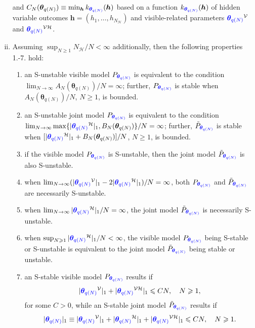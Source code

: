 \documentclass[numbib]{imamat}
\theoremstyle{theorem}
\theoremstyle{lemma}
\theoremstyle{example}
\theoremstyle{corollary}
\theoremstyle{definition}
\theoremstyle{remark}
\theoremstyle{approximation}
\theoremstyle{scheme}
\newcommand{\thetaidx}{q(N)}
\newcommand{\thetaN}{\boldsymbol \theta_{\thetaidx}}
\newcommand{\elt}{A_{N}(\thetaN) }
\newcommand{\Gam}{B_{N}(\thetaN) }
\newcommand{\Gamc}{C_{N}(\thetaN) }
\newcommand{\ak}[1]{{\color{blue} #1}}
\begin{document}
\begin{enumerate}[(i)]
$$    $$ 
    and $\Gamc \equiv \min_{ \boldsymbol h} k_{\ak{\thetaN}} (\boldsymbol h)$ based on a function  $k_{\ak{\thetaN}} (\boldsymbol h)$ of hidden variable outcomes $\boldsymbol h = (h_1,\ldots,h_{N_{\mathcal{H}}})$ and visible-related parameters $\ak{\thetaN}^{\mathcal{V}}$ and $\ak{\thetaN}^{\mathcal{VH}}$.
\item Assuming $\sup_{N \geq 1} N_{\mathcal{H}}/N<\infty$ additionally, then the following properties 1.-7. hold:
\begin{enumerate}[1.] \itemsep 0cm
    \item an S-unstable visible model $P_{\ak{\thetaN}}$ is equivalent to the condition $\lim_{N\to \infty}  \elt/N  =\infty$; further, $P_{\ak{\thetaN}}$ is stable when $\elt/N$, $N \geq 1$, is bounded.
    \item an S-unstable joint model $P_{\ak{\thetaN}}$ is equivalent to the condition $\lim_{N\to \infty} \max\{|\ak{\thetaN}^{\mathcal{H}}|_1, \Gam\}/N =\infty$; further,  $\tilde{P}_{\ak{\thetaN}}$ is stable when $[|\ak{\thetaN}^{\mathcal{H}}|_1+ \Gam]/N$, $N \geq 1$, is bounded.
    \item if the visible model $P_{\ak{\thetaN}}$   is S-unstable, then  the joint model $\tilde{P}_{\ak{\thetaN}}$ is also S-unstable.
    \item when $\lim_{N\to \infty}  (|\ak{\thetaN}^{\mathcal{V}}|_1-2|\ak{\thetaN}^{\mathcal{H}}|_1)/N =\infty$, both $P_{\ak{\thetaN}}$ and $\tilde{P}_{\ak{\thetaN}}$ are necessarily S-unstable.
    \item when $\lim_{N\to \infty}|\ak{\thetaN}^{\mathcal{H}}|_1/N =\infty$,  the joint model $\tilde{P}_{\ak{\thetaN}}$ is necessarily S-unstable.
    \item when $\sup_{N \geq 1} |\ak{\thetaN}^{\mathcal{H}}|_1 /N<\infty$, the visible model $P_{\ak{\thetaN}}$ being S-stable or S-unstable is equivalent to the joint model  $\tilde{P}_{\ak{\thetaN}}$ being stable or unstable.
    \item  an S-stable visible model $P_{\ak{\thetaN}}$ results if
        $$
        |\ak{\thetaN}^{\mathcal{V}}|_1+ |\ak{\thetaN}^{\mathcal{VH}} |_1  \leq CN,\quad N \geq 1,
        $$
        for some $C>0$, while an S-stable joint model $\tilde{P}_{\ak{\thetaN}}$  results if
        $$
        |\ak{\thetaN}|_1 \equiv  |\ak{\thetaN}^{\mathcal{V}}|_1+|\ak{\thetaN}^{\mathcal{H}}|_1 +|\ak{\thetaN}^{\mathcal{VH}} |_1  \leq  C N ,\quad N \geq 1.
        $$
\end{enumerate}
\end{enumerate}
\end{document}
